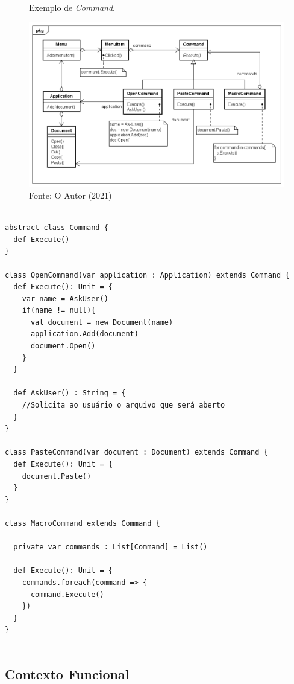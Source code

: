 \begin{figure}[htb]
	\caption{\label{command_exemplo}Exemplo de \textit{Command}.}
	\begin{center}
	    \includegraphics[scale=0.5]{5_padroes-contexto-funcional/5.3_comportamentais/5.3.02_command/command_exemplo.png}
	\end{center}
  \caption*{Fonte: O Autor (2021)}
\end{figure}

\begin{lstlisting}[caption={\textit{Command} Orientação a Objetos.},label=oocommand]

abstract class Command {
  def Execute()
}

class OpenCommand(var application : Application) extends Command {
  def Execute(): Unit = {
    var name = AskUser()
    if(name != null){
      val document = new Document(name)
      application.Add(document)
      document.Open()
    }
  }

  def AskUser() : String = {
    //Solicita ao usuário o arquivo que será aberto
  }
}

class PasteCommand(var document : Document) extends Command {
  def Execute(): Unit = {
    document.Paste()
  }
}

class MacroCommand extends Command {

  private var commands : List[Command] = List()

  def Execute(): Unit = {
    commands.foreach(command => {
      command.Execute()
    })
  }
}
    
\end{lstlisting}

\subsection*{Contexto Funcional}

